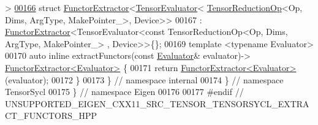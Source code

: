 \begin{DoxyCode}
      >
\hyperlink{struct_eigen_1_1_tensor_sycl_1_1internal_1_1_functor_extractor_3_01_tensor_evaluator_3_01_tensor8c6d922b20ff2a8da717377cef7d5ede}{00166} \textcolor{keyword}{struct }\hyperlink{struct_eigen_1_1_tensor_sycl_1_1internal_1_1_functor_extractor}{FunctorExtractor}<\hyperlink{struct_eigen_1_1_tensor_evaluator}{TensorEvaluator}<
      \hyperlink{class_eigen_1_1_tensor_reduction_op}{TensorReductionOp}<Op, Dims, ArgType, MakePointer\_>, Device>>
00167 : \hyperlink{struct_eigen_1_1_tensor_sycl_1_1internal_1_1_functor_extractor}{FunctorExtractor}<TensorEvaluator<const TensorReductionOp<Op, Dims, ArgType, MakePointer\_>
      , Device>>\{\};
00169 \textcolor{keyword}{template} <\textcolor{keyword}{typename} Evaluator>
00170 \textcolor{keyword}{auto} \textcolor{keyword}{inline} extractFunctors(\textcolor{keyword}{const} \hyperlink{struct_eigen_1_1_tensor_evaluator_3_01const_01_tensor_reduction_op_3_01_op_00_01_dims_00_01_arg_4fdf2ec1445de4704eb590bc98040dc6}{Evaluator}& evaluator)-> 
      \hyperlink{struct_eigen_1_1_tensor_sycl_1_1internal_1_1_functor_extractor}{FunctorExtractor<Evaluator>} \{
00171   \textcolor{keywordflow}{return} \hyperlink{struct_eigen_1_1_tensor_sycl_1_1internal_1_1_functor_extractor}{FunctorExtractor<Evaluator>}(evaluator);
00172 \}
00173 \}  \textcolor{comment}{// namespace internal}
00174 \}  \textcolor{comment}{// namespace TensorSycl}
00175 \}  \textcolor{comment}{// namespace Eigen}
00176 
00177 \textcolor{preprocessor}{#endif  // UNSUPPORTED\_EIGEN\_CXX11\_SRC\_TENSOR\_TENSORSYCL\_EXTRACT\_FUNCTORS\_HPP}
\end{DoxyCode}
